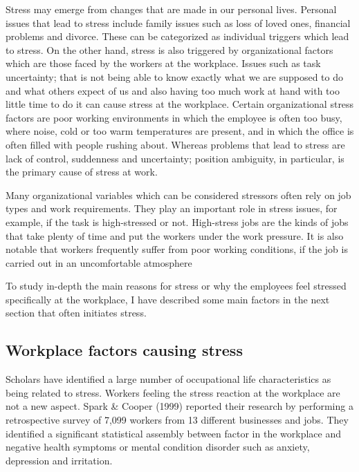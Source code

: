 Stress may emerge from changes that are made in our personal lives.  Personal issues that lead to stress include family issues such as loss of loved ones, financial problems and divorce.  These can be categorized as individual triggers which lead to stress.  On the other hand, stress is also triggered by organizational factors which are those faced by the workers at the workplace. Issues such as task uncertainty; that is not being able to know exactly what we are supposed to do and what others expect of us and also having too much work at hand with too little time to do it can cause stress at the workplace.  Certain organizational stress factors are poor working environments in which the employee is often too busy, where noise, cold or too warm temperatures are present, and in which the office is often filled with people rushing about.  Whereas problems that lead to stress are lack of control, suddenness and uncertainty; position ambiguity, in particular, is the primary cause of stress at work. \citep[p.350]{Parker2008PersonalityProcess}

Many organizational variables which can be considered stressors often rely on job types and work requirements.  They play an important role in stress issues, for example, if the task is high-stressed or not.  High-stress jobs are the kinds of jobs that take plenty of time and put the workers under the work pressure. It is also notable that workers frequently suffer from poor working conditions, if the job is carried out in an uncomfortable atmosphere \cite[p.317]{Bloisi2007ManagementBehaviour}

To study  in-depth  the  main  reasons for stress  or  why  the  employees  feel  stressed specifically at the workplace, I have described some main factors in the next section that often initiates stress.

\subsection{Workplace factors causing stress}

Scholars have identified a large number of occupational life characteristics as being related to stress.  Workers feeling the stress reaction at the workplace are not a new aspect. Spark \& Cooper (1999) reported their research by performing a retrospective survey of 7,099 workers from 13 different businesses and jobs.   They identified a significant statistical assembly between factor in the workplace and negative health symptoms or mental condition disorder such as anxiety, depression and irritation.

